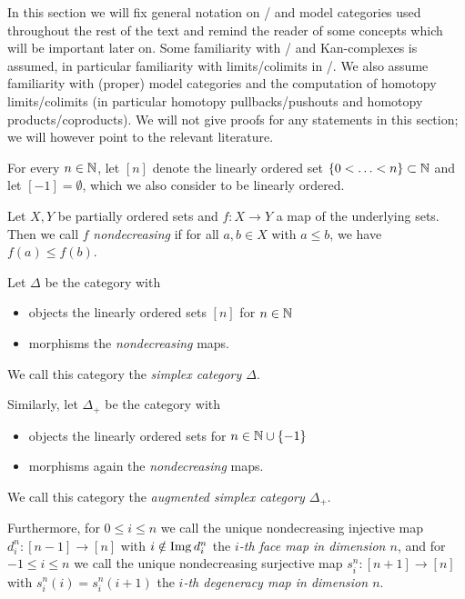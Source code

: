 In this section we will fix general notation on \inftycats/ and model categories used throughout the rest of the text and remind the reader of some concepts which will be important later on.
Some familiarity with \inftycats/ and Kan-complexes is assumed, in particular familiarity with limits/colimits in \inftycats/.
We also assume familiarity with (proper) model categories and the computation of homotopy limits/colimits (in particular homotopy pullbacks/pushouts and homotopy products/coproducts). 
We will not give proofs for any statements in this section; we will however point to the relevant literature.
\begin{definition}
    For every $n\in\mathbb{N}$, let $[n]$ denote the linearly ordered set $\left\lbrace0<\ldots<n\right\rbrace\subset\mathbb{N}$ and let $[-1]=\emptyset$, which we also consider to be linearly ordered.
\end{definition}
\begin{definition}
    Let $X,Y$ be partially ordered sets and $f\colon X\to Y$ a map of the underlying sets.
    Then we call $f$ \emph{nondecreasing} if for all $a,b\in X$ with $a\leq b$, we have $f(a)\leq f(b)$.
\end{definition}
\begin{definition}
    Let $\Delta$ be the category with
    \begin{itemize}
        \item objects the linearly ordered sets $[n]$ for $n\in\mathbb{N}$
        \item morphisms the \emph{nondecreasing} maps.
    \end{itemize}
    We call this category the \emph{simplex category $\Delta$}.

    Similarly, let $\Delta_+$ be the category with
    \begin{itemize}
        \item objects the linearly ordered sets for $n\in\mathbb{N}\cup\left\lbrace-1\right\rbrace$ 
        \item morphisms again the \emph{nondecreasing} maps.
    \end{itemize}
    We call this category the \emph{augmented simplex category $\Delta_+$}.

    Furthermore, for $0\leq i\leq n$ we call the unique nondecreasing injective map $d_i^n\colon[n-1]\to[n]$ with $i\notin\operatorname{Img} d_i^n$ the \emph{$i$-th face map in dimension $n$}, and for $-1\leq i\leq n$ we call the unique nondecreasing surjective map $s_i^n\colon[n+1]\to[n]$ with $s_i^n(i)=s_i^n(i+1)$ the \emph{$i$-th degeneracy map in dimension $n$}.
\end{definition}
